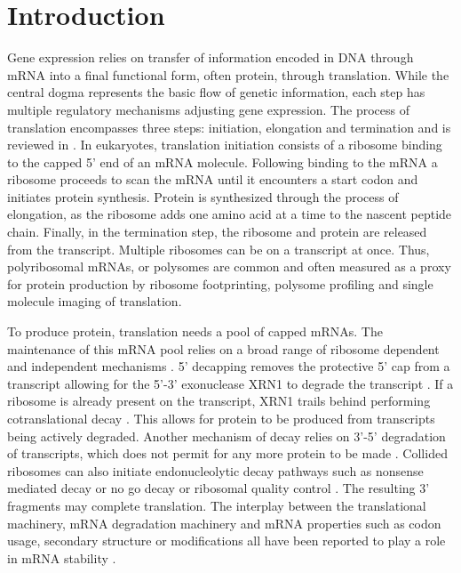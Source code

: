 \documentclass[a4,center,fleqn]{NAR}
\begin{document}
\enlargethispage{-65.1pt}


\section{Introduction}

Gene expression relies on transfer of information encoded in DNA through mRNA into a final functional form, often protein, through translation. While the central dogma represents the basic flow of genetic information, each step has multiple regulatory mechanisms adjusting gene expression. The process of translation encompasses three steps: initiation, elongation and termination and is reviewed in \citep{RN1,RN2}. In eukaryotes, translation initiation consists of a ribosome binding to the capped 5' end of an mRNA molecule. Following binding to the mRNA a ribosome proceeds to scan the mRNA until it encounters a start codon and initiates protein synthesis. Protein is synthesized through the process of elongation, as the ribosome adds one amino acid at a time to the nascent peptide chain. Finally, in the termination step, the ribosome and protein are released from the transcript. Multiple ribosomes can be on a transcript at once. Thus, polyribosomal mRNAs, or polysomes are common and often measured as a proxy for protein production by ribosome footprinting, polysome profiling and single molecule imaging of translation. 


To produce protein, translation needs a pool of capped mRNAs. The maintenance of this mRNA pool relies on a broad range of ribosome dependent and independent mechanisms \citep{RN3}. 5' decapping removes the protective 5' cap from a transcript allowing for the 5'-3' exonuclease XRN1 to degrade the transcript \citep{RN3}. If a ribosome is already present on the transcript, XRN1 trails behind performing cotranslational decay \citep{RN4}. This allows for protein to be produced from transcripts being actively degraded. Another mechanism of decay relies on 3'-5' degradation of transcripts, which does not permit for any more protein to be made \citep{RN5}. Collided ribosomes can also initiate endonucleolytic decay pathways such as nonsense mediated decay or no go decay or ribosomal quality control \citep{RN6,RN7}. The resulting 3' fragments may complete translation. The interplay between the translational machinery, mRNA degradation machinery and mRNA properties such as codon usage, secondary structure or modifications all have been reported to play a role in mRNA stability \citep{RN8, RN9, RN10}.
\end{document}
